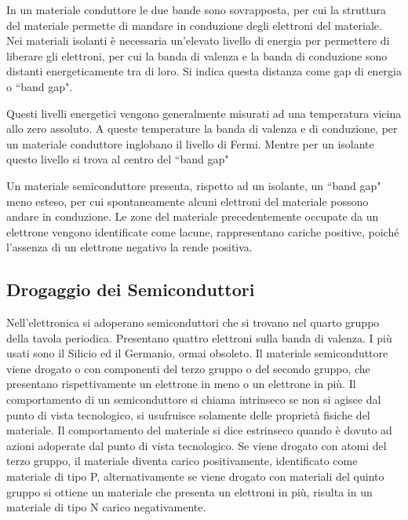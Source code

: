 \documentclass{article}
\numberwithin{equation}{subsection}
\begin{document}
In un materiale conduttore le due bande sono sovrapposta, per cui la struttura del materiale permette di mandare in conduzione degli elettroni del materiale. 
Nei materiali isolanti è necessaria un'elevato livello di energia per permettere di liberare gli elettroni, per cui la banda di valenza e la banda di conduzione sono 
distanti energeticamente tra di loro. Si indica questa distanza come gap di energia o ``band gap". 

Questi livelli energetici vengono generalmente misurati ad una temperatura vicina allo zero assoluto. A queste temperature la banda di valenza e di conduzione, per un materiale 
conduttore inglobano il livello di Fermi. Mentre per un isolante questo livello si trova al centro del ``band gap"

Un materiale semiconduttore presenta, rispetto ad un isolante, un ``band gap" meno esteso, per cui spontaneamente alcuni elettroni del materiale 
possono andare in conduzione. 
Le zone del materiale precedentemente occupate da un elettrone vengono identificate come lacune, rappresentano cariche positive, poiché l'assenza di un 
elettrone negativo la rende positiva. 

\subsection{Drogaggio dei Semiconduttori}

Nell'elettronica si adoperano semiconduttori che si trovano nel quarto gruppo della tavola periodica. Presentano quattro elettroni sulla banda di valenza. I più usati 
sono il Silicio ed il Germanio, ormai obsoleto. Il materiale semiconduttore viene drogato o con componenti del terzo gruppo o del secondo gruppo, che presentano 
rispettivamente un elettrone 
in meno o un elettrone in più. Il comportamento di un semiconduttore si chiama intrinseco se non si agisce dal punto di vista tecnologico, si usufruisce solamente delle 
proprietà fisiche del materiale. Il comportamento del materiale si dice estrinseco quando è dovuto ad azioni adoperate dal punto di vista tecnologico. 
Se viene drogato con atomi del terzo gruppo, il materiale diventa carico positivamente, identificato come materiale di tipo P, alternativamente se viene drogato con materiali 
del quinto gruppo si ottiene un materiale che presenta un elettroni in più, risulta in un materiale di tipo N carico negativamente. 
\end{document}
